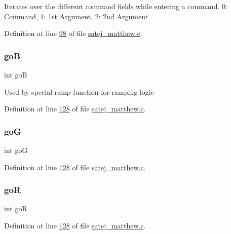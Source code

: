 Iterates over the different command fields while entering a command. 0\+: Command, 1\+: 1st Argument, 2\+: 2nd Argument 

Definition at line \mbox{\hyperlink{satej__matthew_8c_source_l00098}{98}} of file \mbox{\hyperlink{satej__matthew_8c_source}{satej\+\_\+matthew.\+c}}.

\mbox{\label{satej__matthew_8c_ae235a503c0bb6555e108f17b7edbd747}} 
\subsubsection{\texorpdfstring{goB}{goB}}
{\footnotesize\ttfamily int goB}

Used by special ramp function for ramping logic 

Definition at line \mbox{\hyperlink{satej__matthew_8c_source_l00128}{128}} of file \mbox{\hyperlink{satej__matthew_8c_source}{satej\+\_\+matthew.\+c}}.

\mbox{\label{satej__matthew_8c_a0cc12126d1ecb5d449eb84ba09e7c625}} 
\subsubsection{\texorpdfstring{goG}{goG}}
{\footnotesize\ttfamily int goG}



Definition at line \mbox{\hyperlink{satej__matthew_8c_source_l00128}{128}} of file \mbox{\hyperlink{satej__matthew_8c_source}{satej\+\_\+matthew.\+c}}.

\mbox{\label{satej__matthew_8c_a528b21c5fb0c0fcf4fe8f8bc549644b3}} 
\subsubsection{\texorpdfstring{goR}{goR}}
{\footnotesize\ttfamily int goR}



Definition at line \mbox{\hyperlink{satej__matthew_8c_source_l00128}{128}} of file \mbox{\hyperlink{satej__matthew_8c_source}{satej\+\_\+matthew.\+c}}.

\mbox{\label{satej__matthew_8c_adbd7138430ce795e6dd1d4534fccfc13}} 

